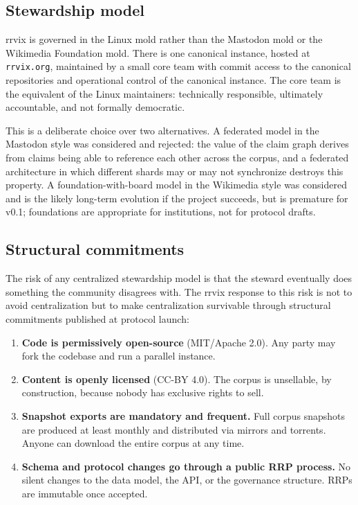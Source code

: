 \documentclass[11pt]{rrvix}
\begin{document}
\subsection{Stewardship model}

rrvix is governed in the Linux mold rather than the Mastodon mold or the Wikimedia Foundation mold. There is one canonical instance, hosted at \texttt{rrvix.org}, maintained by a small core team with commit access to the canonical repositories and operational control of the canonical instance. The core team is the equivalent of the Linux maintainers: technically responsible, ultimately accountable, and not formally democratic.

This is a deliberate choice over two alternatives. A federated model in the Mastodon style was considered and rejected: the value of the claim graph derives from claims being able to reference each other across the corpus, and a federated architecture in which different shards may or may not synchronize destroys this property. A foundation-with-board model in the Wikimedia style was considered and is the likely long-term evolution if the project succeeds, but is premature for v0.1; foundations are appropriate for institutions, not for protocol drafts.

\subsection{Structural commitments}

The risk of any centralized stewardship model is that the steward eventually does something the community disagrees with. The rrvix response to this risk is not to avoid centralization but to make centralization survivable through structural commitments published at protocol launch:

\begin{enumerate}[leftmargin=2em, itemsep=0.3em]
\item \textbf{Code is permissively open-source} (MIT/Apache 2.0). Any party may fork the codebase and run a parallel instance.
\item \textbf{Content is openly licensed} (CC-BY 4.0). The corpus is unsellable, by construction, because nobody has exclusive rights to sell.
\item \textbf{Snapshot exports are mandatory and frequent.} Full corpus snapshots are produced at least monthly and distributed via mirrors and torrents. Anyone can download the entire corpus at any time.
\item \textbf{Schema and protocol changes go through a public RRP process.} No silent changes to the data model, the API, or the governance structure. RRPs are immutable once accepted.
\end{enumerate}
\end{document}
